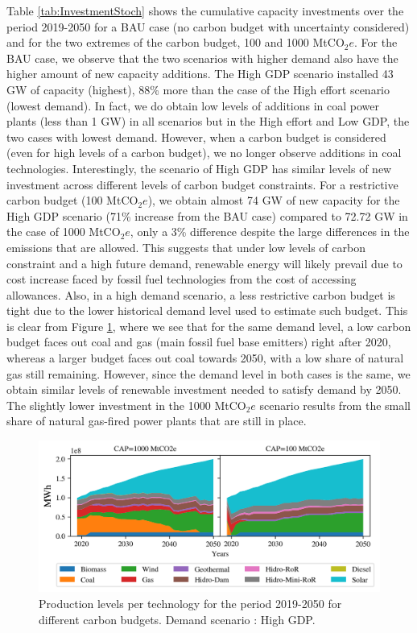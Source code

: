 \documentclass[11pt, letterpaper]{article}
\begin{document}
Table \ref{tab:InvestmentStoch} shows the cumulative capacity investments over the period 2019-2050 for a BAU case (no carbon budget with uncertainty considered) and for the two extremes of the carbon budget, 100 and 1000 MtCO$_2e$. For the BAU case, we observe that the two scenarios with higher demand also have the higher amount of new capacity additions. The High GDP scenario installed 43 GW of capacity (highest), 88\% more than the case of the High effort scenario (lowest demand). In fact, we do obtain low levels of additions in coal power plants (less than 1 GW) in all scenarios but in the High effort and Low GDP, the two cases with lowest demand. However, when a carbon budget is considered (even for high levels of a carbon budget), we no longer observe additions in coal technologies. 
\smallskip
Interestingly, the scenario of High GDP has similar levels of new investment across different levels of carbon budget constraints. For a restrictive carbon budget (100 MtCO$_2e$), we obtain almost 74 GW of new capacity for the High GDP scenario (71\% increase from the BAU case) compared to 72.72 GW in the case of 1000 MtCO$_2e$, only a 3\% difference despite the large differences in the emissions that are allowed. This suggests that under low levels of carbon constraint and a high future demand, renewable energy will likely prevail due to cost increase faced by fossil fuel technologies from the cost of accessing allowances. Also, in a high demand scenario, a less restrictive carbon budget is tight due to the lower historical demand level used to estimate such budget. This is clear from Figure \ref{fig:comp_100_1000}, where we see that for the same demand level, a low carbon budget faces out coal and gas (main fossil fuel base emitters) right after 2020, whereas a larger budget faces out coal towards 2050, with a low share of natural gas still remaining. However, since the demand level in both cases is the same, we obtain similar levels of renewable investment needed to satisfy demand by 2050. The slightly lower investment in the 1000 MtCO$_2e$ scenario results from the small share of natural gas-fired power plants that are still in place. 
\smallskip

\begin{figure}[ht]
\centering
    \includegraphics[width=5.5in]{draft_paper/Figures/auxiliar.png}
\caption{Production levels per technology for the period 2019-2050 for different carbon budgets.  Demand scenario : High GDP.}
  \label{fig:comp_100_1000}
\end{figure}
\end{document}
